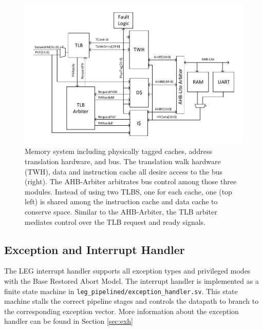 \begin{figure}[h!]
\centering
\includegraphics[width=\textwidth]{./diagrams/mmu.pdf}
\caption{Memory system including physically tagged caches, address translation hardware, and bus. The translation walk hardware (TWH), data and
instruction cache all desire access to the bus (right). The AHB-Arbiter
arbitrates bus control among those three modules. Instead of using two TLBS,
one for each cache, one (top left) is shared among the instruction cache and
data cache to conserve space. Similar to the AHB-Arbiter, the TLB arbiter
mediates control over the TLB request and ready signals.}
\label{fig:mem}
\end{figure}

\subsection{Exception and Interrupt Handler}

The LEG interrupt handler supports all exception types and privileged modes with the Base Restored Abort Model.
The interrupt handler is implemented as a finite state machine in \texttt{leg\_pipelined/exception\_handler.sv}.
This state machine stalls the correct pipeline stages and controls the datapath to branch to the corresponding exception vector.
More information about the exception handler can be found in Section \ref{sec:exh}
